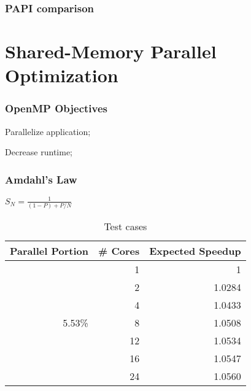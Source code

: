 \documentclass{beamer}
\begin{document}
\begin{frame}
	\frametitle{PAPI comparison}
	\begin{figure}[!htp]
	\label{fig:original_papi}
	\end{figure}
	\begin{figure}[!htp]
	\label{fig:optm_papi}
	\end{figure}
\end{frame}


\section{Shared-Memory Parallel Optimization}
\begin{frame}
	\frametitle{OpenMP Objectives}
	\begin{description}
		\item Parallelize application;
		\item Decrease runtime;
	\end{description}
\end{frame}	


\begin{frame}
	\frametitle{Amdahl's Law}
		
		$S_{N}=\frac{1}{(1-P) + P/N}$

		\begin{center}
			\begin{table}[!htp]
			\begin{tabular}{|r|r|r|}
			\hline
			\textbf{Parallel Portion} & \textbf{\# Cores} & \textbf{Expected Speedup}\\
			\hline
			 & 1 & 1 \\
			 & 2 & 1.0284 \\
			 & 4 & 1.0433 \\
			 5.53\% & 8 & 1.0508 \\
			 & 12 & 1.0534 \\
			 & 16 & 1.0547 \\
			 & 24 & 1.0560 \\
			\hline
			\end{tabular}
			\caption{Test cases}
			\label{tab:testcases}
			\end{table}
		\end{center}	
\end{frame}
\end{document}
